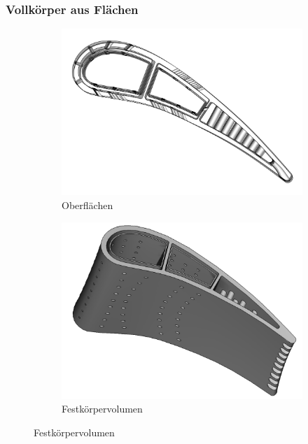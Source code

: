 \documentclass[8pt, aspectratio=169]{beamer}
\begin{document}
\begin{frame}
	\frametitle{Vollkörper aus Flächen}
	\vspace{-1.5cm}\hspace{-0.5cm}
	\begin{minipage}{\textwidth}
		\begin{figure}
			\begin{subfigure}{.3\textwidth}
				\centering
				\includegraphics[width=\textwidth, trim={5px 5px 5px 5px}, clip]{../../assets/solid/surfaces.png}
				\caption{Oberflächen}
			\end{subfigure}
			\begin{subfigure}{.3\textwidth}
				\centering
				\includegraphics[width=\textwidth]{../../assets/solid/solid.png}
				\caption{Festkörpervolumen}
			\end{subfigure}

\end{figure}
\end{minipage}
\end{frame}
\end{document}
